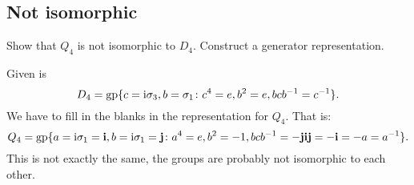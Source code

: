\documentclass[11pt, english, fleqn, DIV=15, headinclude, BCOR=1cm]{scrartcl}
\newcommand\inv{^{-1}}
\begin{document}
\subsection{Not isomorphic}

\begin{problem}
    Show that $Q_4$ is not isomorphic to $D_4$. Construct a generator
    representation.
\end{problem}

Given is
\[
    D_4 = \operatorname{gp} \{c = \iup\3, b = \1 \colon c^4 = e, b^2 = e,
    bcb\inv = c\inv\}.
\]
We have to fill in the blanks in the representation for $Q_4$. That is:
\[
    Q_4 = \operatorname{gp} \{a = \iup\1 = \qi, b = \iup\1 = \qj \colon a^4 =
        e, b^2 = -1, bcb\inv = -\qj\qi\qj = - \qi = - a = a\inv \}.
\]
This is not exactly the same, the groups are probably not isomorphic to each
other.
\end{document}
